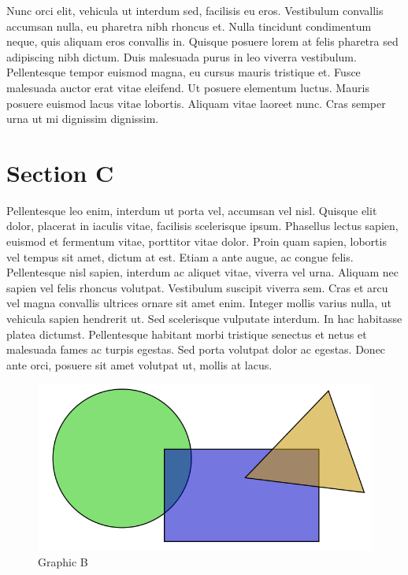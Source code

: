 \documentclass[10pt,oneside]{article}
\begin{document}
Nunc orci elit, vehicula ut interdum sed, facilisis eu eros. Vestibulum convallis accumsan nulla, eu pharetra nibh rhoncus et. Nulla tincidunt condimentum neque, quis aliquam eros convallis in. Quisque posuere lorem at felis pharetra sed adipiscing nibh dictum. Duis malesuada purus in leo viverra vestibulum. Pellentesque tempor euismod magna, eu cursus mauris tristique et. Fusce malesuada auctor erat vitae eleifend. Ut posuere elementum luctus. Mauris posuere euismod lacus vitae lobortis. Aliquam vitae laoreet nunc. Cras semper urna ut mi dignissim dignissim. \cite{book_b}


\section{Section C}


Pellentesque leo enim, interdum ut porta vel, accumsan vel nisl. Quisque elit dolor, placerat in iaculis vitae, facilisis scelerisque ipsum. Phasellus lectus sapien, euismod et fermentum vitae, porttitor vitae dolor. Proin quam sapien, lobortis vel tempus sit amet, dictum at est. Etiam a ante augue, ac congue felis. Pellentesque nisl sapien, interdum ac aliquet vitae, viverra vel urna. Aliquam nec sapien vel felis rhoncus volutpat. Vestibulum suscipit viverra sem. Cras et arcu vel magna convallis ultrices ornare sit amet enim. Integer mollis varius nulla, ut vehicula sapien hendrerit ut. Sed scelerisque vulputate interdum. In hac habitasse platea dictumst. Pellentesque habitant morbi tristique senectus et netus et malesuada fames ac turpis egestas. Sed porta volutpat dolor ac egestas. Donec ante orci, posuere sit amet volutpat ut, mollis at lacus.

\begin{figure}[h]
\begin{centering}
    \includegraphics[scale=1]{fig/b/b}
    \caption{Graphic B}
\end{centering}
\end{figure}
\end{document}
